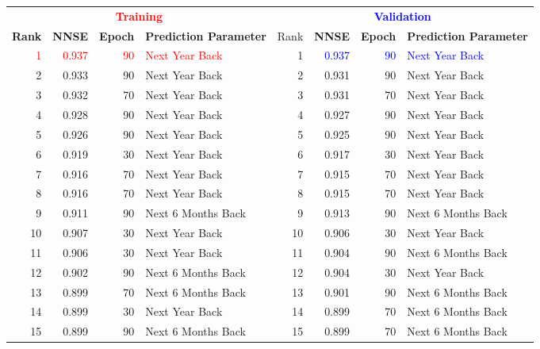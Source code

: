 \documentclass[utf8]{FrontiersinVancouver} %
\begin{document}
\begin{table}[htb]
\renewcommand{\arraystretch}{1.2}
      \begin{center}
        {\footnotesize
    \begin{tabular}{|r|r|r|l| |r|r|r|l|}
      \hline
     \multicolumn{4}{|c||}{\bf \textcolor{red}{Training}}  & \multicolumn{4}{c|}{\bf \textcolor{blue}{Validation}}  \\
    {\bf Rank} &  {\bf NNSE} &  {\bf Epoch} & {\bf Prediction Parameter} & Rank & {\bf NNSE} &  {\bf Epoch} & {\bf Prediction Parameter}\\
    \hline
    \hline
        \textcolor{red}{1}  &  \textcolor{red}{0.937} &     \textcolor{red}{90} &  \textcolor{red}{Next Year Back} &  1 & \textcolor{blue}{0.937} &     \textcolor{blue}{90} &  \textcolor{blue}{Next Year Back} \\
    2  &  0.933 &     90 &      Next Year Back &  2 & 0.931 &     90 &      Next Year Back \\
3  &  0.932 &     70 &      Next Year Back &  3 & 0.931 &     70 &      Next Year Back \\
4  &  0.928 &     90 &      Next Year Back &  4 & 0.927 &     90 &      Next Year Back \\
5  &  0.926 &     90 &      Next Year Back &  5 & 0.925 &     90 &      Next Year Back \\
6  &  0.919 &     30 &      Next Year Back &  6 & 0.917 &     30 &      Next Year Back \\
7  &  0.916 &     70 &      Next Year Back &  7 & 0.915 &     70 &      Next Year Back \\
8  &  0.916 &     70 &      Next Year Back &  8 & 0.915 &     70 &      Next Year Back \\
9  &  0.911 &     90 &  Next 6 Months Back &  9 & 0.913 &     90 &  Next 6 Months Back \\
10  &  0.907 &     30 &      Next Year Back &  10 & 0.906 &     30 &      Next Year Back \\
11  &  0.906 &     30 &      Next Year Back &  11 & 0.904 &     90 &  Next 6 Months Back \\
12  &  0.902 &     90 &  Next 6 Months Back &  12 & 0.904 &     30 &      Next Year Back \\
13  &  0.899 &     70 &  Next 6 Months Back &  13 & 0.901 &     90 &  Next 6 Months Back \\
14  &  0.899 &     30 &      Next Year Back &  14 & 0.899 &     70 &  Next 6 Months Back \\
15  &  0.899 &     90 &  Next 6 Months Back &  15 & 0.899 &     70 &  Next 6 Months Back \\

\end{tabular}}
\end{center}
\end{table}
\end{document}
